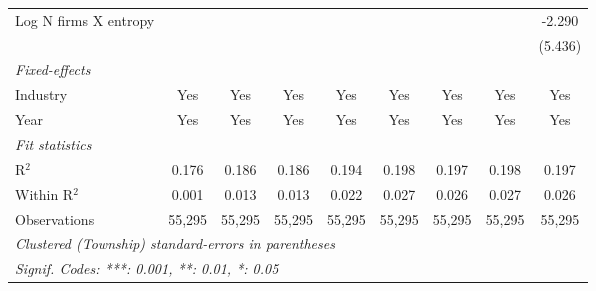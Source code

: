 \begin{tabular}{lcccccccc}
   Log N firms X entropy                                 &                &                 &                 &                  &                 &                 &                 & -2.290\\   
                                                         &                &                 &                 &                  &                 &                 &                 & (5.436)\\   
   \midrule
   \emph{Fixed-effects}\\
   Industry                                              & Yes            & Yes             & Yes             & Yes              & Yes             & Yes             & Yes             & Yes\\  
   Year                                                  & Yes            & Yes             & Yes             & Yes              & Yes             & Yes             & Yes             & Yes\\  
   \midrule
   \emph{Fit statistics}\\
   R$^2$                                                 & 0.176          & 0.186           & 0.186           & 0.194            & 0.198           & 0.197           & 0.198           & 0.197\\  
   Within R$^2$                                          & 0.001          & 0.013           & 0.013           & 0.022            & 0.027           & 0.026           & 0.027           & 0.026\\  
   Observations                                          & 55,295         & 55,295          & 55,295          & 55,295           & 55,295          & 55,295          & 55,295          & 55,295\\  
   \midrule \midrule
   \multicolumn{9}{l}{\emph{Clustered (Township) standard-errors in parentheses}}\\
   \multicolumn{9}{l}{\emph{Signif. Codes: ***: 0.001, **: 0.01, *: 0.05}}\\
\end{tabular}
\par\endgroup
